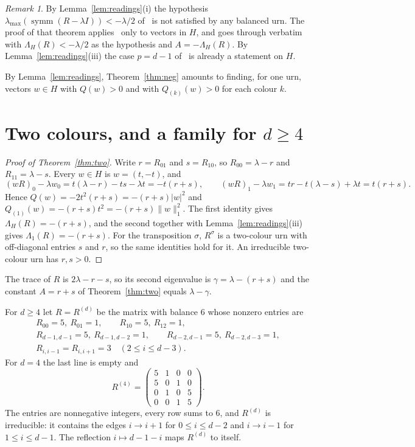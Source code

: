 \documentclass[11pt]{amsart}
\theoremstyle{definition}
\theoremstyle{remark}
\newtheorem{remark}[theorem]{Remark}
\newcommand{\symm}{\operatorname{symm}}
\begin{document}
\begin{remark}\label{rem:thm12}
By Lemma~\ref{lem:readings}(i) the hypothesis $\lambda_{\max}(\symm(R-\lambda I))<-\lambda/2$ of~\cite[Theorem~1.2, p.~2]{NP} is not satisfied by any balanced urn. The proof of that theorem applies~\cite[Proposition~3.6]{NP} only to vectors in $H$, and goes through verbatim with $\Lambda_H(R)<-\lambda/2$ as the hypothesis and $A=-\Lambda_H(R)$. By Lemma~\ref{lem:readings}(iii) the case $p=d-1$ of~\cite[Proposition~3.6]{NP} is already a statement on $H$.
\end{remark}

By Lemma~\ref{lem:readings}, Theorem~\ref{thm:neg} amounts to finding, for one urn, vectors $w\in H$ with $Q(w)>0$ and with $Q_{(k)}(w)>0$ for each colour $k$.

\section{Two colours, and a family for \texorpdfstring{$d\ge 4$}{d >= 4}}\label{sec:family}

\begin{proof}[Proof of Theorem~\ref{thm:two}]
Write $r=R_{01}$ and $s=R_{10}$, so $R_{00}=\lambda-r$ and $R_{11}=\lambda-s$. Every $w\in H$ is $w=(t,-t)$, and
\[
(wR)_0-\lambda w_0=t(\lambda-r)-ts-\lambda t=-t(r+s),\qquad (wR)_1-\lambda w_1=tr-t(\lambda-s)+\lambda t=t(r+s).
\]
Hence $Q(w)=-2t^2(r+s)=-(r+s)|w|^2$ and $Q_{(1)}(w)=-(r+s)t^2=-(r+s)\|w\|_1^2$. The first identity gives $\Lambda_H(R)=-(r+s)$, and the second together with Lemma~\ref{lem:readings}(iii) gives $\Lambda_1(R)=-(r+s)$. For the transposition $\sigma$, $R^\sigma$ is a two-colour urn with off-diagonal entries $s$ and $r$, so the same identities hold for it. An irreducible two-colour urn has $r,s>0$.
\end{proof}

The trace of $R$ is $2\lambda-r-s$, so its second eigenvalue is $\gamma=\lambda-(r+s)$ and the constant $A=r+s$ of Theorem~\ref{thm:two} equals $\lambda-\gamma$.

For $d\ge 4$ let $R=R^{(d)}$ be the matrix with balance $6$ whose nonzero entries are
\[
\begin{gathered}
R_{00}=5,\ R_{01}=1,\qquad R_{10}=5,\ R_{12}=1,\\
R_{d-1,d-1}=5,\ R_{d-1,d-2}=1,\qquad R_{d-2,d-1}=5,\ R_{d-2,d-3}=1,\\
R_{i,i-1}=R_{i,i+1}=3\quad(2\le i\le d-3).
\end{gathered}
\]
For $d=4$ the last line is empty and
\[
R^{(4)}=\begin{pmatrix}5&1&0&0\\5&0&1&0\\0&1&0&5\\0&0&1&5\end{pmatrix}.
\]
The entries are nonnegative integers, every row sums to $6$, and $R^{(d)}$ is irreducible: it contains the edges $i\to i+1$ for $0\le i\le d-2$ and $i\to i-1$ for $1\le i\le d-1$. The reflection $i\mapsto d-1-i$ maps $R^{(d)}$ to itself.
\end{document}
